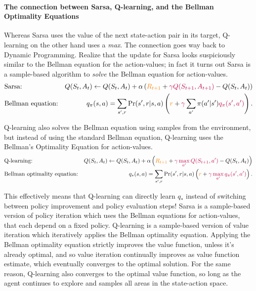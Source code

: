 \documentclass[12pt]{article}
\begin{document}
\paragraph{The connection between Sarsa, Q-learning, and the Bellman Optimality Equations}
Whereas Sarsa uses the value of the next state-action pair in its target, Q-learning on the other hand uses a \emph{max}. The connection goes way back to Dynamic Programming. Realize that the update for Sarsa looks suspiciously similar to the Bellman equation for the action-values; in fact it turns out Sarsa is a sample-based algorithm to \emph{solve} the Bellman equation for action-values.
\begin{align*}
  &\textrm{Sarsa:} \hspace{20pt} &Q(S_t, A_t) \gets Q(S_t, A_t) + \alpha   \left({\color{orange}R_{t+1}} + {\color{purple} \gamma Q(S_{t+1}, A_{t+1})} - Q(S_t, A_t)\right) \\
  &\textrm{Bellman equation:} &q_\pi(s,a) = \sum_{s',r} \Pr(s', r | s, a) \left( {\color{orange} r} + {\color{purple}\gamma} \sum_{a'} \pi(a'|s') {\color{purple} q_\pi(s',a')}\right).
\end{align*}

Q-learning also solves the Bellman equation using samples from the environment, but instead of using the standard Bellman equation, Q-learning uses the Bellman's Optimality Equation for action-values.
\begin{align*}
  &\textrm{Q-learning:} \hspace{20pt} &Q(S_t, A_t) \gets Q(S_t, A_t) + \alpha   \left({\color{orange}R_{t+1}} + {\color{purple} \gamma \max_{a'} Q(S_{t+1}, a')} - Q(S_t, A_t)\right) \\
  &\textrm{Bellman optimality equation:} &q_*(s,a) = \sum_{s',r} \Pr(s', r | s, a) \left( {\color{orange} r} + {\color{purple}\gamma \max_{a'} q_\pi(s',a')}\right).
\end{align*}

This effectively means that Q-learning can directly learn $q_*$ instead of switching between policy improvement and policy evaluation steps! Sarsa is a sample-based version of policy iteration which uses the Bellman equations for action-values, that each depend on a fixed policy. Q-learning is a sample-based version of value iteration which iteratively applies the Bellman optimality equation. Applying the Bellman optimality equation strictly improves the value function, unless it's already optimal, and so value iteration continually improves as value function estimate, which eventually converges to the optimal solution.  For the same reason, Q-learning also converges to the optimal value function, so long as the agent continues to explore and samples all areas in the state-action space.
\end{document}

